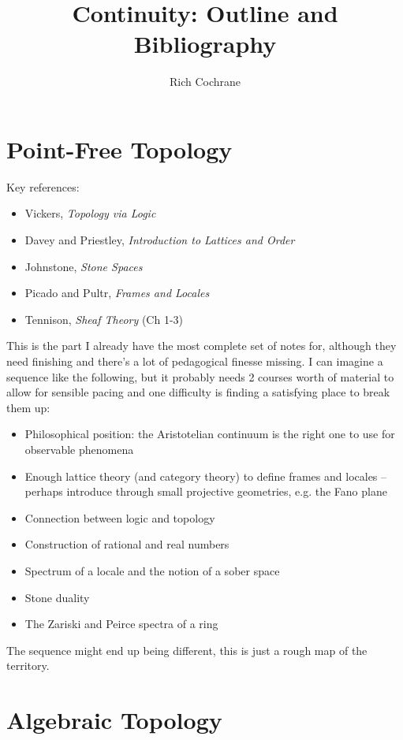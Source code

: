 \documentclass[article]{article}
\begin{document}
\title{Continuity: Outline and Bibliography}
\author{Rich Cochrane}
\maketitle

\section{Point-Free Topology}

Key references:
\begin{itemize}
	\item{Vickers, \emph{Topology via Logic}}
	\item{Davey and Priestley, \textit{Introduction to Lattices and Order}}
	\item{Johnstone, \emph{Stone Spaces}}
	\item{Picado and Pultr, \emph{Frames and Locales}}
	\item{Tennison, \emph{Sheaf Theory} (Ch 1-3)}
\end{itemize}

This is the part I already have the most complete set of notes for, although they need finishing and there's a lot of pedagogical finesse missing. I can imagine a sequence like the following, but it probably needs 2 courses worth of material to allow for sensible pacing and one difficulty is finding a satisfying place to break them up:
\begin{itemize}
	\item{Philosophical position: the Aristotelian continuum is the right one to use for observable phenomena}
	\item{Enough lattice theory (and category theory) to define frames and locales -- perhaps introduce through small projective geometries, e.g. the Fano plane}
	\item{Connection between logic and topology}
	\item{Construction of rational and real numbers}
	\item{Spectrum of a locale and the notion of a sober space}
	\item{Stone duality}
	\item{The Zariski and Peirce spectra of a ring}
\end{itemize}
The sequence might end up being different, this is just a rough map of the territory.

\section{Algebraic Topology}
\end{document}

